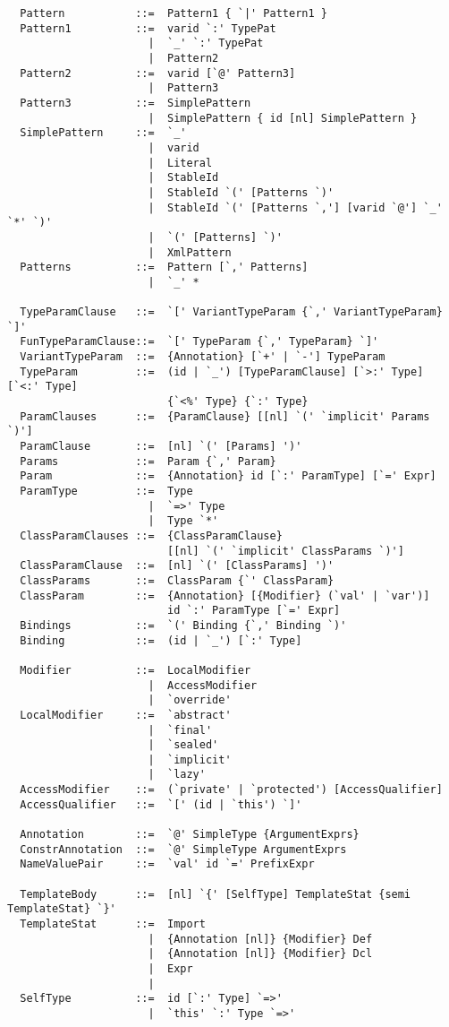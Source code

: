 {\begin{lstlisting}
  Pattern           ::=  Pattern1 { `|' Pattern1 }
  Pattern1          ::=  varid `:' TypePat
                      |  `_' `:' TypePat
                      |  Pattern2
  Pattern2          ::=  varid [`@' Pattern3]
                      |  Pattern3
  Pattern3          ::=  SimplePattern
                      |  SimplePattern { id [nl] SimplePattern }
  SimplePattern     ::=  `_'
                      |  varid
                      |  Literal
                      |  StableId
                      |  StableId `(' [Patterns `)'
                      |  StableId `(' [Patterns `,'] [varid `@'] `_' `*' `)'
                      |  `(' [Patterns] `)'
                      |  XmlPattern
  Patterns          ::=  Pattern [`,' Patterns]
                      |  `_' *

  TypeParamClause   ::=  `[' VariantTypeParam {`,' VariantTypeParam} `]'
  FunTypeParamClause::=  `[' TypeParam {`,' TypeParam} `]'
  VariantTypeParam  ::=  {Annotation} [`+' | `-'] TypeParam
  TypeParam         ::=  (id | `_') [TypeParamClause] [`>:' Type] [`<:' Type] 
                         {`<%' Type} {`:' Type}
  ParamClauses      ::=  {ParamClause} [[nl] `(' `implicit' Params `)']
  ParamClause       ::=  [nl] `(' [Params] ')'
  Params            ::=  Param {`,' Param}
  Param             ::=  {Annotation} id [`:' ParamType] [`=' Expr]
  ParamType         ::=  Type 
                      |  `=>' Type 
                      |  Type `*'
  ClassParamClauses ::=  {ClassParamClause} 
                         [[nl] `(' `implicit' ClassParams `)']
  ClassParamClause  ::=  [nl] `(' [ClassParams] ')'
  ClassParams       ::=  ClassParam {`' ClassParam}
  ClassParam        ::=  {Annotation} [{Modifier} (`val' | `var')] 
                         id `:' ParamType [`=' Expr]
  Bindings          ::=  `(' Binding {`,' Binding `)'
  Binding           ::=  (id | `_') [`:' Type]

  Modifier          ::=  LocalModifier 
                      |  AccessModifier
                      |  `override'
  LocalModifier     ::=  `abstract'
                      |  `final'
                      |  `sealed'
                      |  `implicit'
                      |  `lazy'
  AccessModifier    ::=  (`private' | `protected') [AccessQualifier]
  AccessQualifier   ::=  `[' (id | `this') `]'

  Annotation        ::=  `@' SimpleType {ArgumentExprs}
  ConstrAnnotation  ::=  `@' SimpleType ArgumentExprs
  NameValuePair     ::=  `val' id `=' PrefixExpr

  TemplateBody      ::=  [nl] `{' [SelfType] TemplateStat {semi TemplateStat} `}'
  TemplateStat      ::=  Import
                      |  {Annotation [nl]} {Modifier} Def
                      |  {Annotation [nl]} {Modifier} Dcl
                      |  Expr
                      |
  SelfType          ::=  id [`:' Type] `=>'
                      |  `this' `:' Type `=>' 


\end{lstlisting}}
